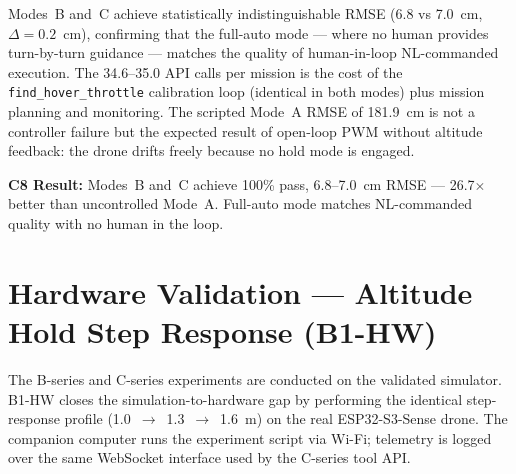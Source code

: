 Modes~B and~C achieve statistically indistinguishable RMSE (6.8 vs 7.0~cm,
$\Delta = 0.2$~cm), confirming that the full-auto mode --- where no human
provides turn-by-turn guidance --- matches the quality of human-in-loop
NL-commanded execution. The 34.6--35.0 API calls per mission is the cost
of the \texttt{find\_hover\_throttle} calibration loop (identical in both
modes) plus mission planning and monitoring. The scripted Mode~A RMSE of
181.9~cm is not a controller failure but the expected result of open-loop
PWM without altitude feedback: the drone drifts freely because no hold
mode is engaged.

\textbf{C8 Result:} Modes~B and~C achieve 100\% pass, 6.8--7.0~cm RMSE ---
26.7$\times$ better than uncontrolled Mode~A. Full-auto mode matches
NL-commanded quality with no human in the loop.


\section{Hardware Validation --- Altitude Hold Step Response (B1-HW)}
\label{sec:ch3_b1hw}

%
%
%

The B-series and C-series experiments are conducted on the validated
simulator. B1-HW closes the simulation-to-hardware gap by performing the
identical step-response profile (1.0~$\to$~1.3~$\to$~1.6~m) on the real
ESP32-S3-Sense drone. The companion computer runs the experiment script via
Wi-Fi; telemetry is logged over the same WebSocket interface used by the
C-series tool API.

